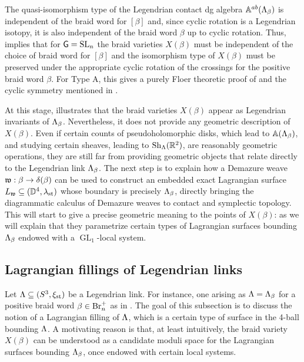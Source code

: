 \begin{remark}
The quasi-isomorphism type of the Legendrian contact dg algebra $\mathbb{A}^{ab}(\Lambda_\beta)$ is independent of the braid word for $[\beta]$ and, since cyclic rotation is a Legendrian isotopy, it is also independent of the braid word $\beta$ up to cyclic rotation. Thus,  implies that for $\mathsf{G}=\operatorname{SL}_n$ the braid varieties $X(\beta)$ must be independent of the choice of braid word for $[\beta]$ and the isomorphism type of $X(\beta)$ must be preserved under the appropriate cyclic rotation of the crossings for the positive braid word $\beta$. For Type A, this gives a purely Floer theoretic proof of  and the cyclic symmetry mentioned in .\sbs
\end{remark}

At this stage,  illustrates that the braid varieties $X(\beta)$ appear as Legendrian invariants of $\Lambda_\beta$. Nevertheless, it does not provide any geometric description of $X(\beta)$. Even if certain counts of pseudoholomorphic disks, which lead to $\mathbb{A}(\Lambda_\beta)$, and studying certain sheaves, leading to $\operatorname{Sh}_\Lambda(\mathbb{R}^2)$, are reasonably geometric operations, they are still far from providing geometric objects that relate directly to the Legendrian link $\Lambda_\beta$. The next step is to explain how a Demazure weave  $\mathfrak{w}:\beta\to\delta(\beta)$ can be used to construct an embedded exact Lagrangian surface $L_{\mathfrak{w}}\subseteq(\mathbb{D}^4,\lambda_{\text{st}})$ whose boundary is precisely $\Lambda_\beta$, directly bringing the diagrammatic calculus of Demazure weaves to contact and symplectic topology. This will start to give a precise geometric meaning to the points of $X(\beta)$: as we will explain that they parametrize certain types of Lagrangian surfaces bounding $\Lambda_\beta$ endowed with a $\operatorname{GL}_1$-local system.

\subsection{Lagrangian fillings of Legendrian links}\label{ssec:Lagrangian_fillings} Let $\Lambda\subseteq(S^3,\xi_{\text{st}})$ be a Legendrian link. For instance, one arising as $\Lambda=\Lambda_\beta$ for a positive braid word $\beta\in\mbox{Br}_n^+$ as in . The goal of this subsection is to discuss the notion of a Lagrangian filling of $\Lambda$, which is a certain type of surface in the 4-ball bounding $\Lambda$. A motivating reason is that, at least intuitively, the braid variety $X(\beta)$ can be understood as a candidate moduli space for the Lagrangian surfaces bounding $\Lambda_\beta$, once endowed with certain local systems.\\

